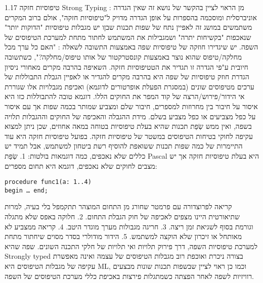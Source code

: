       1.17 טיפוסיות חזקה Strong Typing : מן הראוי לציין בהקשר של נושא זה שאין
      הגדרה אוניברסלית ומוסכמה בהספרות על אופן הגדרה מדויק ל"טיפוסיות חזקה",
      אולם ברוב המקרים משתמשים במושג זה לאפיין נתח של שפות תכנות שבןו יש מגבלות
      טיפוסיות "הדוקות יותר" שנאכפות "בקשיחות יתרה" ושמגבילות את המשתמש לחתור
      מתחת למערכת הטיפוסים של השפה. יש שיגדירו חוזקה של טיפוסיות שפה באמצעות
      התשובה לשאלה : "האם כל ערך מכל מחלקה/טיפוס שהוא נוצר באמצעות קונסטרקטור
      של אותו טיפוס/מחלקה?", כשתשובה חיובית ע"פי הגדרה זו תגדיר את הטטיפוסיות
      חזקה. השאיפה בהרבה מקרים מאחורי ניסיון הגדרת חוזק טיפוסיות של שפה היא
      בהרבה מקרים להגדיר או לאפיין הגבלת התבוללות של ערכים מטיפוסים שונים
      (במסגרת הפעלת אופרטורים לדוגמא) ואכיפת מגבלויות אלו שגוררת אי
      הידור/פירוש/הרצה של קוד המפר את החוקים הללו.
      דוגמא טובה להתבוללות כזו היא איסור על חיבור בין מחרוזות למספרים, חיבור שלם ומצביע שמותר בכמה שפות אך עם איסור על כפל מצביעים או כפל מצביע בשלם.
      מידת ההגבלה והאכיפה של החוקים וההגבלות תלויה בשפה, ואין ממש שְׂפַת תכנות שהיא בעלת טיפוסיות בטוחה במאה אחוזים, שכן ניתן למצוא עקיפה לחוקי בטיחות הטיפוסים במשטר של טיפוסיות חזקה.
      בפועל טיפוסיות חזקה היא עוד התיימרות של כמה שפות תכנות ששואפת להוסיף רשת ביטחון למשתמש, אבל תמיד יש כללים שלא נאכפים, כמה דוגמאות בולטות:
      1. שְׂפַת Pascal היא בעלת טיפוסיות חזקה אך יש מצבים לחוקים שלא נאכפים, דוגמא היא תחום מספרים:

\begin{verbatim}
procedure func1(a: 1..4)
begin … end;
\end{verbatim}

      קריאה לפרוצדורה עם פרמטר שחורג מן התחום המוצהר תתקמפל בלי בעיה, למרות שתיאורטית היינו מצפים לאכיפה של חוק הגבלת התחום.
      2. חלוקה באפס שלא מתגלה וגורמת בסוף לשגיאת זמן ריצה.
      3. חריגה מגבולות מערך מוגדר היטב.
      4. קריאה ממצביע לא מאותחל או זיכרון שלא הוקצה למשתמש.
      5. הידור מודולרי בסדר מסוים שיחתור מתחת למערכת טיפוסיות השפה, דרך פירוק תלויות ואי תלויות של חלקי התכנה השונים.
      שפה שהיא Strongly typed בצורה ניכרת ואוכפת רוב מגבלות הטיפוסים של עצמה ואינה מאפשרת עקיפה של מגבלות הטיפוסים היא ML, וכמו כן ראוי לציין שבשפות תכנות שונות מבצעים רוויזיות לשפה לאחר הפצתה כשמתגלות פירצות באכיפת כללי מערכת הטיפוסים של השפה.

